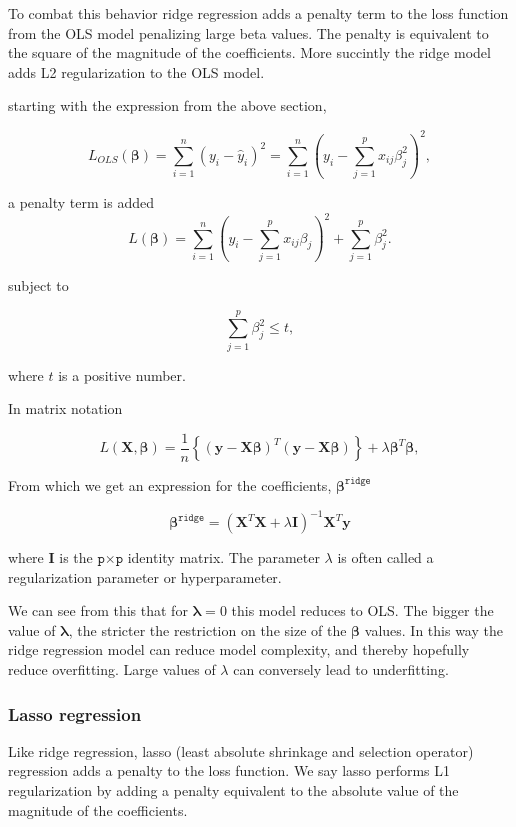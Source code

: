 \documentclass[11pt]{article}
\begin{document}
To combat this behavior ridge regression adds a penalty term to the loss
function from the OLS model penalizing large beta values. The penalty is
equivalent to the square of the magnitude of the coefficients. More
succintly the ridge model adds L2 regularization to the OLS model.

starting with the expression from the above section,

\[
L_{OLS}(\boldsymbol{\beta})=\sum_{i=1}^{n}\left(y_i-\hat{y}_i\right)^2=\sum_{i=1}^{n}(y_i-\sum_{j=1}^{p}x_{ij}\beta_j^2)^2,
\]

a penalty term is added \[
L(\boldsymbol{\beta})=\sum_{i=1}^{n}(y_i-\sum_{j=1}^{p}x_{ij}\beta_j)^2+\sum_{j=1}^{p}\beta_j^2.
\]

subject to

\[
\sum_{j=1}^{p} \beta_j^2 \leq t,
\]

where \(t\) is a positive number.

In matrix notation

\[
L(\boldsymbol{X},\boldsymbol{\beta})=\frac{1}{n}\left\{(\boldsymbol{y}-\boldsymbol{X}\boldsymbol{\beta})^T(\boldsymbol{y}-\boldsymbol{X}\boldsymbol{\beta})\right\}+\lambda\boldsymbol{\beta}^T\boldsymbol{\beta},
\]

From which we get an expression for the coefficients,
\(\boldsymbol{\beta}^{\texttt{ridge}}\)

\[
\boldsymbol{\beta}^{\texttt{ridge}} = \left(\boldsymbol{X}^T\boldsymbol{X}+\lambda\boldsymbol{I}\right)^{-1}\boldsymbol{X}^T\boldsymbol{y}
\]

where \(\boldsymbol{I}\) is the \(\texttt{p×p}\) identity matrix. The
parameter \(\lambda\) is often called a regularization parameter or
hyperparameter.

We can see from this that for \(\boldsymbol{\lambda}=0\) this model
reduces to OLS. The bigger the value of \(\boldsymbol{\lambda}\), the
stricter the restriction on the size of the \(\boldsymbol{\beta}\)
values. In this way the ridge regression model can reduce model
complexity, and thereby hopefully reduce overfitting. Large values of
\(\lambda\) can conversely lead to underfitting.

    \hypertarget{lasso-regression}{%
\subsubsection{Lasso regression}\label{lasso-regression}}

Like ridge regression, lasso (least absolute shrinkage and selection
operator) regression adds a penalty to the loss function. We say lasso
performs L1 regularization by adding a penalty equivalent to the
absolute value of the magnitude of the coefficients.
\end{document}
